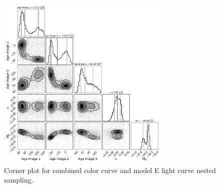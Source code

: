 \documentclass[12pt,dvipsnames]{article}
\begin{document}
\begin{figure}
    \centering
    \includegraphics[width=0.75\textwidth]{Images/corner_combined_lc_color_model_E.pdf}
    \caption{Corner plot for combined color curve and model E light curve nested sampling.}
    \label{fig:corner_combined}
\end{figure}
\end{document}
